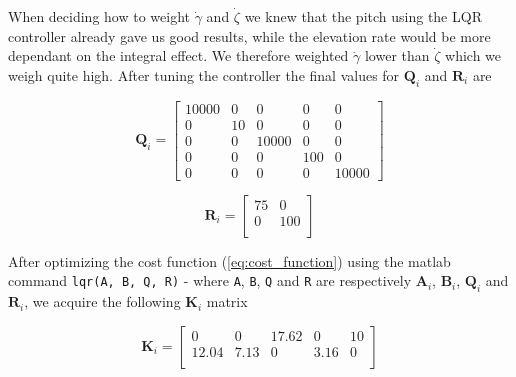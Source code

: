 \medskip

When deciding how to weight $\dot{\gamma}$ and $\dot{\zeta}$ we knew that the pitch using the LQR controller already gave us good results, while the elevation rate would be more dependant on the integral effect. We therefore weighted $\dot{\gamma}$ lower than $\dot{\zeta}$ which we weigh quite high. After tuning the controller the final values for $\bm{Q}_i$ and $\bm{R}_i$ are

\begin{equation} \label{eq:Q_pi}
    \bm{Q}_i = 
	\begin{bmatrix}
		10000 &  0    &  0      &  0   &  0 \\
		0     &  10   &  0      &  0   &  0 \\
		0     &  0    &  10000  &  0   &  0 \\
		0     &  0    &  0      &  100 &  0 \\
		0     &  0    &  0      &  0   &  10000
	\end{bmatrix}
\end{equation} 

\begin{equation} \label{eq:R_pi}
    \bm{R}_i = 
	\begin{bmatrix}
		75   & 0  \\
		0    & 100\\

	\end{bmatrix}
\end{equation} 

After optimizing the cost function (\ref{eq:cost_function}) using the matlab command \texttt{lqr(A, B, Q, R)} - where \texttt{A}, \texttt{B}, \texttt{Q} and \texttt{R} are  respectively $\bm{A}_i$, $\bm{B}_i$, $\bm{Q}_i$ and $\bm{R}_i$,
we acquire the following $\bm{K}_i$ matrix

\begin{equation} \label{eq:K_pi}
    \bm{K}_i = 
	\begin{bmatrix}
		0      &  0      & 17.62 &  0     &  10 \\
		12.04  &  7.13   & 0     &  3.16  &  0 \\
	\end{bmatrix}
\end{equation} 


